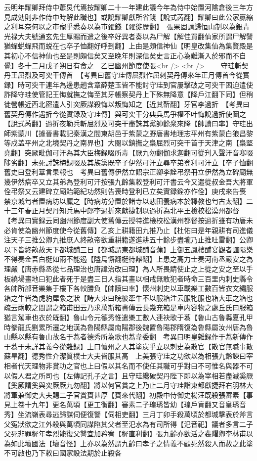 云明年耀卿拜侍中蕭炅代焉按耀卿二十一年建此議今年為侍中始置河隂倉後三年方見成効則非作侍中時解此職也】或說耀卿獻所省錢【說式芮翻】耀卿曰此公家贏縮之利耳奈何以之市寵乎悉奏以為市糴錢【糴徙歷翻】　張果固請歸恒山制以為銀青光禄大夫號通玄先生厚賜而遣之後卒好異者奏以為尸解【解佳買翻仙家所謂尸解譬猶蟬蜕蟬飛而蜕在也卒子恤翻好呼到翻】上由是頗信神仙【明皇改集仙為集賢殿是其初心不信神仙也至是則頗信矣又至晩年則深信矣史言正心為難漸入於邪而不自覺】冬十二月戊子朔日有食之　乙巳幽州節度使張<br />
<br />
　　守珪斬契丹王屈烈及可突干傳首　【考異曰舊守珪傳屈烈作屈刺契丹傅來年正月傅首今從實録】時可突干連年為邊患趙含章薛楚玉皆不能討守珪到官屢擊破之可突干困迫遣使詐降守珪使管記王悔就撫之悔至其牙帳察契丹上下殊無降意【降戶江翻下同】但稍徙營帳近西北密遣人引突厥謀殺悔以叛悔知之【近其靳翻】牙官李過折　【考異曰舊契丹傅作遇折今從實録及守珪傳】與可突干分典兵馬爭權不叶悔說過折使圖之【說式芮翻】過折夜勒兵斬屈烈及可突干盡誅其黨帥餘衆來降【帥讀曰率】守珪出師紫蒙川【據晉書載記秦漢之間東胡邑于紫蒙之野唐書地理志平州有紫蒙白狼昌黎等戍盖平州之北境契丹之南界也】大閱以鎮撫之梟屈烈可突干首于天津之南【梟堅堯翻】突厥毗伽可汗為其大臣梅録啜所毒【厥九勿翻伽求迦翻可從刋入聲汗音寒啜陟劣翻】未死討誅梅録啜及其族黨既卒子伊然可汗立尋卒弟登利可汗立【卒子恤翻舊史曰登利華言果報也　考異曰舊傳伊然立詔宗正卿李詮弔祭冊立伊然為立碑廟無幾伊然病卒又立其弟為登利可汗按張九齡集敕登利可汗書云今又遣從叔金吾大將軍佺弔祭又云建碑立廟貽範紀功然則告喪時登利已立矣實録銓亦作佺】庚戌來告喪　禁京城匄者置病坊以廩之【時病坊分置於諸寺以悲田養病本於釋教也匄古太翻】二十三年春正月契丹知兵馬中郎李過折來獻捷制以過折為北平王檢校松漠州都督　【考異曰實録云同幽州節度副大使舊傳云授特進檢校松漢州都督按過折雖有功唐未必肯使為幽州節度使今從舊傳】乙亥上耕籍田九推乃止【杜佑曰是年親耕有司進儀注天子三推公卿九推庶人終畝帝欲重耕籍遂進耕五十餘步盡壠乃止推吐雷翻】公卿以下皆終畝赦天下都城酺三日【都城謂東都城酺音蒲】上御五鳳樓酺宴觀者諠隘樂不得奏金吾白梃如雨不能遏【隘烏懈翻梃待鼎翻】上患之高力士奏河南丞嚴安之為理嚴【唐赤縣丞從七品理治也唐諱治改曰理】為人所畏請使止之上從之安之至以手板繞場畫地曰犯此者死于是盡三日人指其畫以相戒無敢犯者時命三百里内刺史縣令各帥所部音樂集于樓下各較勝負【帥讀曰率】懷州刺史以車載樂工數百皆衣文繡服箱之牛皆為虎豹犀象之狀【詩大東曰晥彼牽牛不以服箱注云服牝服也箱大車之箱也疏云兩較之間謂之箱甫田云乃求萬斯箱書傳云長幾充箱是車内容物之處丘氏曰服箱猶言駕車也衣於既翻】魯山令元德秀惟遣樂工數人連袂歌于蒍【魯山古魯縣夏孔甲時豢龍氏劉累所遷之地漢為魯陽縣屬南陽郡後魏置魯陽郡隋復為魯縣屬汝州唐為魯山縣以縣有魯山故名于蒍者德秀所為歌也蒍韋委翻　考異曰明皇雜録作于蒍新傳作于蒍于未詳其義今從雜録】上曰懷州之人其塗炭乎立以刺史為散官【散官無職事散蘇旱翻】德秀性介潔質樸士大夫皆服其高　上美張守珪之功欲以為相張九齡諫曰宰相者代天理物非賞功之官也上曰假以其名而不使任其職可乎對曰不可惟名與器不可以假人君之所司也【左傳記孔子之言】且守珪纔破契丹陛下即以為宰相若盡滅奚厥【奚厥謂奚與突厥厥九勿翻】將以何官賞之上乃止二月守珪詣東都獻捷拜右羽林大將軍兼御史大夫賜二子官賞賚甚厚【賚來代翻】初殿中侍御史楊汪既殺張審素【事見上卷十九年】更名萬頃【更工衡翻】審素二子瑝琇皆幼【瑝戶肓翻又音皇琇音秀】坐流嶺表尋逃歸謀伺便復讐【伺相吏翻】三月丁卯手殺萬頃於都城擊表於斧言父寃狀欲之江外殺與萬頃同謀陷其父者至汜水為有司所得【汜音祀】議者多言二子父死非罪穉年孝烈能復父讐宜加矜宥【穉直利翻】張九齡亦欲活之裴耀卿李林甫以為如此壞國法【壞音怪】上亦以為然謂九齡曰孝子之情義不顧死然殺人而赦之此塗不可啟也乃下敕曰國家設法期於止殺各